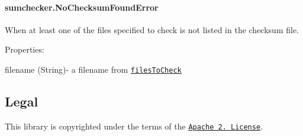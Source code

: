 \paragraph*{{\ttfamily sumchecker.\+No\+Checksum\+Found\+Error}}

When at least one of the files specified to check is not listed in the checksum file.

Properties\+:


\begin{DoxyItemize}
\item {\ttfamily filename} ({\ttfamily String})-\/ a filename from \href{#filesToCheck}{\tt {\ttfamily files\+To\+Check}}
\end{DoxyItemize}

\subsection*{Legal}

This library is copyrighted under the terms of the \href{http://www.apache.org/licenses/LICENSE-2.0}{\tt Apache 2. License}. 